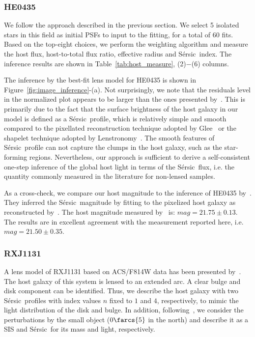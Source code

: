 \documentclass[fleqn,usenatbib]{mnras}
\newcommand{\sersic}{S\'ersic}
\newcommand{\lenstronomy}{{\sc Lenstronomy}}
\begin{document}
\subsubsection{HE0435}\label{subsec:HE0435}
We follow the approach described in the previous section. We select 5 isolated stars in this field as initial PSFs to input to the fitting, for a total of 60 fits. Based on the top-eight choices, we perform the weighting algorithm and measure the host flux, host-to-total flux ratio, effective radius and \sersic\ index. The inference results are shown in Table~\ref{tab:host_measure}, (2)$-$(6) columns.

The inference by the best-fit lens model for HE0435 is shown in Figure~\ref{fig:image_inference}-(a). Not surprisingly, we note that the residuals level in the normalized plot appears to be larger than the ones presented by~\citet{Wong2017}. This is primarily due to the fact that the surface brightness of the host galaxy in our model is defined as a \sersic\ profile, which is relatively simple and smooth compared to the pixellated reconstruction technique adopted by {\sc Glee}~\citep{Suy++06, Halk2008, S+H10, Suyu2012} or the shapelet technique adopted by \lenstronomy~\citep{Birrer2015}. The smooth features of \sersic\ profile can not capture the clumps in the host galaxy, such as the star-forming regions. Nevertheless, our approach is sufficient to derive a self-consistent one-step inference of the global host light in terms of the \sersic\ flux, i.e. the quantity commonly measured in the literature for non-lensed samples. 

As a cross-check, we compare our host magnitude to the inference of HE0435 by~\citet{Ding2017b}. They inferred the \sersic\ magnitude by fitting to the pixelized host galaxy as reconstructed by~\citet{Wong2017}. The host magnitude measured by~\citet{Ding2017b} is: $mag = 21.75 \pm 0.13$. %
The results are in excellent agreement with the measurement reported here, i.e. $mag = 21.50 \pm 0.35$.

\subsubsection{RXJ1131}
A lens model of RXJ1131 based on ACS/F814W data has been presented by~\citet{Suyu2013}. The host galaxy of this system is lensed to an extended arc. A clear bulge and disk component can be identified. Thus, we describe the host galaxy with two \sersic\ profiles with index values $n$ fixed to $1$ and $4$, respectively, to mimic the light distribution of the disk and bulge. In addition, following~\citet{Suyu2013}, we consider the perturbations by the small object ($0\farcs{5}$ in the north) and describe it as a SIS and \sersic\ for its mass and light, respectively.
\end{document}
